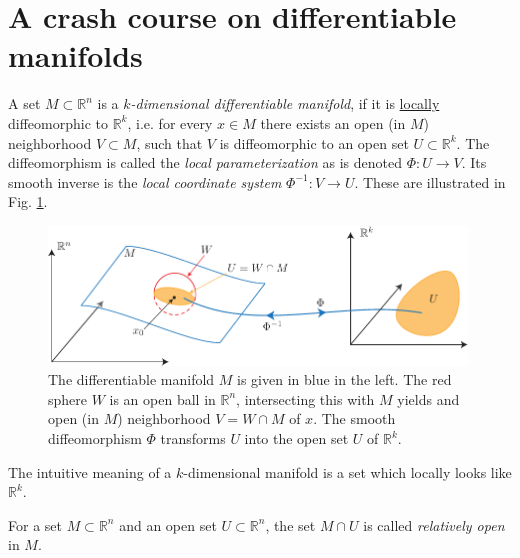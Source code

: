 \section{A crash course on differentiable manifolds}
\begin{definition}
	A set $M\subset \mathbb{R}^{n}$ is a \emph{$k$-dimensional differentiable manifold}, if it is \underline{locally} diffeomorphic to $\mathbb{R}^{k}$, i.e. for every $x\in M$ there exists an open (in $M$) neighborhood $V\subset M $, such that $V$ is diffeomorphic to an open set $U \subset \mathbb{R}^{k}$. The diffeomorphism is called the \emph{local parameterization} as is denoted $\Phi:U \to V$. Its smooth inverse is the \emph{local coordinate system} $\Phi^{-1}:V \to U$. These are illustrated in Fig. \ref{fig:diffble_mfd}.
	\begin{figure}[h!]
		\centering
		\includegraphics[width=0.99\textwidth]{figures/ch9/2diffble_mfd.pdf}
		\caption{The differentiable manifold $M$ is given in blue in the left. The red sphere $W$ is an open ball in  $\mathbb{R}^{n}$, intersecting this with $M$ yields and open (in $M$) neighborhood $V=W \cap M$ of $x $. The smooth diffeomorphism $\Phi $ transforms $U$ into the open set $U$ of $\mathbb{R}^{k}$.}
		\label{fig:diffble_mfd}
	\end{figure}
\end{definition}

The intuitive meaning of a $k$-dimensional manifold is a set which locally looks like $\mathbb{R}^{k}$.

\begin{definition}
	For a set $M\subset \mathbb{R}^{n}$ and an open set $U\subset \mathbb{R}^{n}$, the set $M\cap U$ is called \emph{relatively open} in $M$.	
\end{definition}

